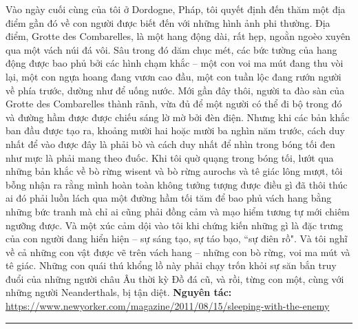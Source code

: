 \begin{multicols}{2}
	\vskip 0.1cm
	Vào ngày cuối cùng của tôi ở Dordogne, Pháp, tôi quyết định đến thăm một địa điểm gần đó về con người được biết đến với những hình ảnh phi thường. Địa điểm, Grotte des Combarelles, là một hang động dài, rất hẹp, ngoằn ngoèo xuyên qua một vách núi đá vôi. Sâu trong đó dăm chục mét, các bức tường của hang động được bao phủ bởi các hình chạm khắc -- một con voi ma mút đang thu vòi lại, một con ngựa hoang đang vươn cao đầu, một con tuần lộc đang rướn người về phía trước, dường như để uống nước. Mới gần đây thôi, người ta đào sàn của Grotte des Combarelles thành rãnh, vừa đủ để một người có thể đi bộ trong đó và đường hầm được được chiếu sáng lờ mờ bởi đèn điện. Nhưng khi các bản khắc ban đầu được tạo ra, khoảng mười hai hoặc mười ba nghìn năm trước, cách duy nhất để vào được đây là phải bò và cách duy nhất để nhìn trong bóng tối đen như mực là phải mang theo đuốc. Khi tôi quờ quạng trong bóng tối, lướt qua những bản khắc về bò rừng wisent và bò rừng aurochs và tê giác lông mượt, tôi bỗng nhận ra rằng mình hoàn toàn không tưởng tượng được điều gì đã thôi thúc ai đó phải luồn lách qua một đường hầm tối tăm để bao phủ vách hang bằng những bức tranh mà chỉ ai cũng phải đồng cảm và mạo hiểm tương tự mới chiêm ngưỡng được. Và một xúc cảm dội vào tôi khi chứng kiến những gì là đặc trưng của con người đang hiển hiện -- sự sáng tạo, sự táo bạo, ``sự điên rồ". Và tôi nghĩ về cả những con vật được vẽ trên vách hang -- những con bò rừng, voi ma mút và tê giác. Những con quái thú khổng lồ này phải chạy trốn khỏi sự săn bắn truy đuổi của những người châu Âu thời kỳ Đồ đá cũ, và rồi, từng con một, cùng với những người Neanderthals, bị tận diệt.
	\vskip 0.1cm
	\textbf{{\color{timhieukhoahoc}Nguyên tác:}} \hspace*{5pt} {\small\url{https://www.newyorker.com/magazine/2011/08/15/sleeping-with-the-enemy}}
\end{multicols}
\vspace*{-10pt}
{\color{timhieukhoahoc}\rule{1\linewidth}{0.1pt}}

